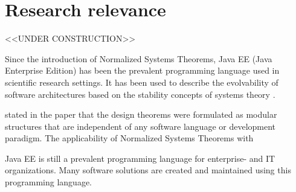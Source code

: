 \newpage \section{Research relevance} \label{research_relevance} 

<<UNDER CONSTRUCTION>>

Since the introduction of Normalized Systems Theorems, Java EE (Java Enterprise Edition)
has been the prevalent programming language used in scientific research settings. It has
been used to describe the evolvability of software architectures based on the stability
concepts of systems theory \parencite[]{mannaert_towards_2012}.

\citeauthor{mannaert_towards_2012} stated in the paper that the design theorems were
formulated as modular structures that are independent of any software language or
development paradigm. The applicability of Normalized Systems Theorems with

Java EE is still a prevalent programming language for enterprise- and IT organizations.
Many software solutions are created and maintained using this programming language.